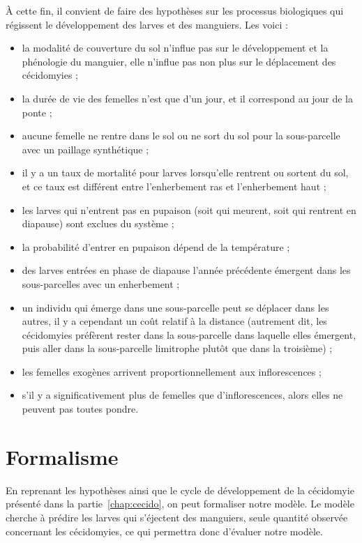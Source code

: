À cette fin, il convient de faire des hypothèses sur les processus biologiques qui régissent le développement des larves et des manguiers.
Les voici :
\begin{itemize}
 \item la modalité de couverture du sol n'influe pas sur le développement et la phénologie du manguier, elle n'influe pas non plus sur le déplacement des cécidomyies ;
 \item la durée de vie des femelles n'est que d'un jour, et il correspond au jour de la ponte ;
 \item aucune femelle ne rentre dans le sol ou ne sort du sol pour la sous-parcelle avec un paillage synthétique ;
 \item il y a un taux de mortalité pour larves lorsqu'elle rentrent ou sortent du sol, et ce taux est différent entre l'enherbement ras et l'enherbement haut ;
 \item les larves qui n'entrent pas en pupaison (soit qui meurent, soit qui rentrent en diapause) sont exclues du système ;
 \item la probabilité d'entrer en pupaison dépend de la température ;
 \item des larves entrées en phase de diapause l'année précédente émergent dans les sous-parcelles avec un enherbement ;
 \item un individu qui émerge dans une sous-parcelle peut se déplacer dans les autres, il y a cependant un coût relatif à la distance (autrement dit, les cécidomyies préfèrent rester dans la sous-parcelle dans laquelle elles émergent, puis aller dans la sous-parcelle limitrophe plutôt que dans la troisième) ;
 \item les femelles exogènes arrivent proportionnellement aux inflorescences ;
 \item s'il y a significativement plus de femelles que d'inflorescences, alors elles ne peuvent pas toutes pondre.
\end{itemize}



\section{Formalisme}

En reprenant les hypothèses ainsi que le cycle de développement de la cécidomyie présenté dans la partie~\ref{chap:cecido}, on peut formaliser notre modèle.
Le modèle cherche à prédire les larves qui s'éjectent des manguiers, seule quantité observée concernant les cécidomyies, ce qui permettra donc d'évaluer notre modèle.

